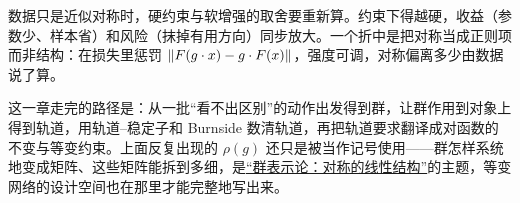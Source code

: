 数据只是近似对称时，硬约束与软增强的取舍要重新算。约束下得越硬，收益（参数少、样本省）和风险（抹掉有用方向）同步放大。一个折中是把对称当成正则项而非结构：在损失里惩罚 \(\left\lVert F(g\cdot x)-g\cdot F(x)\right\rVert\)，强度可调，对称偏离多少由数据说了算。

这一章走完的路径是：从一批``看不出区别''的动作出发得到群，让群作用到对象上得到轨道，用轨道--稳定子和 Burnside 数清轨道，再把轨道要求翻译成对函数的不变与等变约束。上面反复出现的 \(\rho(g)\) 还只是被当作记号使用——群怎样系统地变成矩阵、这些矩阵能拆到多细，是\hyperref[ch:035]{``群表示论：对称的线性结构''}的主题，等变网络的设计空间也在那里才能完整地写出来。
